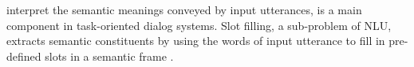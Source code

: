 interpret the semantic meanings conveyed by input utterances, 
is a main component in task-oriented dialog systems. 
Slot filling, a sub-problem of NLU, extracts semantic constituents
by using the words of input utterance to fill in pre-defined slots in 
a semantic frame \cite{mesnil2015using}.

